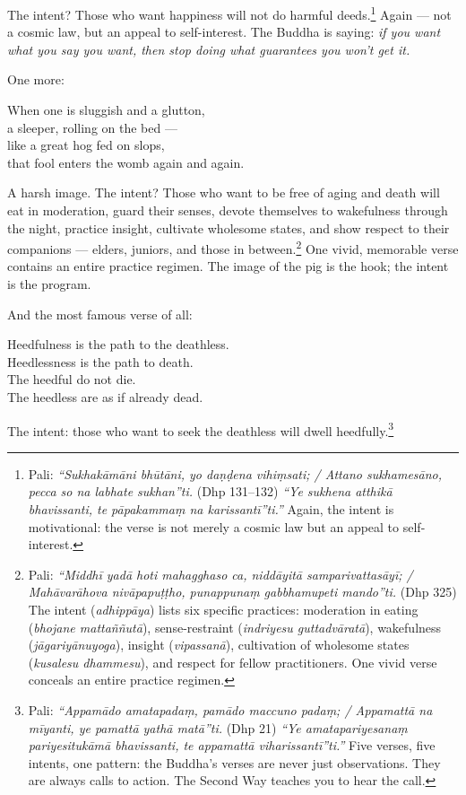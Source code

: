 The intent? Those who want happiness will not do harmful deeds.\footnote{Pali: \textit{``Sukhakāmāni bhūtāni, yo daṇḍena vihiṃsati; / Attano sukhamesāno, pecca so na labhate sukhan''ti.} (Dhp 131--132) \textit{``Ye sukhena atthikā bhavissanti, te pāpakammaṃ na karissantī''ti.''} Again, the intent is motivational: the verse is not merely a cosmic law but an appeal to self-interest.} Again --- not a cosmic law, but an appeal to self-interest. The Buddha is saying: \textit{if you want what you say you want, then stop doing what guarantees you won't get it.}

One more:

\begin{versebox}
When one is sluggish and a glutton,\\
a sleeper, rolling on the bed ---\\
like a great hog fed on slops,\\
that fool enters the womb again and again.
\end{versebox}

A harsh image. The intent? Those who want to be free of aging and death will eat in moderation, guard their senses, devote themselves to wakefulness through the night, practice insight, cultivate wholesome states, and show respect to their companions --- elders, juniors, and those in between.\footnote{Pali: \textit{``Middhī yadā hoti mahagghaso ca, niddāyitā samparivattasāyī; / Mahāvarāhova nivāpapuṭṭho, punappunaṃ gabbhamupeti mando''ti.} (Dhp 325) The intent (\textit{adhippāya}) lists six specific practices: moderation in eating (\textit{bhojane mattaññutā}), sense-restraint (\textit{indriyesu guttadvāratā}), wakefulness (\textit{jāgariyānuyoga}), insight (\textit{vipassanā}), cultivation of wholesome states (\textit{kusalesu dhammesu}), and respect for fellow practitioners. One vivid verse conceals an entire practice regimen.} One vivid, memorable verse contains an entire practice regimen. The image of the pig is the hook; the intent is the program.

And the most famous verse of all:

\begin{versebox}
Heedfulness is the path to the deathless.\\
Heedlessness is the path to death.\\
The heedful do not die.\\
The heedless are as if already dead.
\end{versebox}

The intent: those who want to seek the deathless will dwell heedfully.\footnote{Pali: \textit{``Appamādo amatapadaṃ, pamādo maccuno padaṃ; / Appamattā na mīyanti, ye pamattā yathā matā''ti.} (Dhp 21) \textit{``Ye amatapariyesanaṃ pariyesitukāmā bhavissanti, te appamattā viharissantī''ti.''} Five verses, five intents, one pattern: the Buddha's verses are never just observations. They are always calls to action. The Second Way teaches you to hear the call.}


